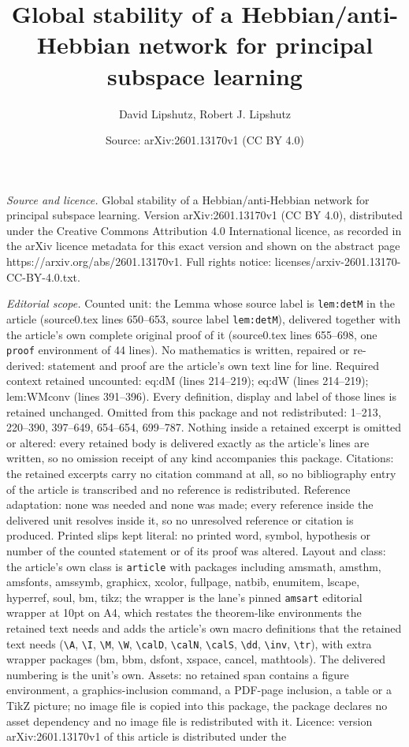 \documentclass[10pt,a4paper]{amsart}
\title[Global stability of a Hebbian/anti-Hebbian network for princ]{Global stability of a Hebbian/anti-Hebbian network for principal subspace learning}
\author{David Lipshutz, Robert J. Lipshutz}
\date{Source: arXiv:2601.13170v1 (CC BY 4.0)}
\begin{document}
\maketitle

\noindent\emph{Source and licence.} Global stability of a Hebbian/anti-Hebbian network for principal subspace learning. Version arXiv:2601.13170v1 (CC BY 4.0), distributed under the Creative Commons Attribution 4.0 International licence, as recorded in the arXiv licence metadata for this exact version and shown on the abstract page https://arxiv.org/abs/2601.13170v1. Full rights notice: licenses/arxiv-2601.13170-CC-BY-4.0.txt.\par\smallskip

\noindent\textit{Editorial scope.} Counted unit: the Lemma whose source label is \texttt{lem:detM} in the article (source0.tex lines 650--653, source label \texttt{lem:detM}), delivered together with the article's own complete original proof of it (source0.tex lines 655--698, one \texttt{proof} environment of 44 lines). No mathematics is written, repaired or re-derived: statement and proof are the article's own text line for line. Required context retained uncounted: eq:dM (lines 214--219); eq:dW (lines 214--219); lem:WMconv (lines 391--396). Every definition, display and label of those lines is retained unchanged. Omitted from this package and not redistributed: 1--213, 220--390, 397--649, 654--654, 699--787. Nothing inside a retained excerpt is omitted or altered: every retained body is delivered exactly as the article's lines are written, so no omission receipt of any kind accompanies this package. Citations: the retained excerpts carry no citation command at all, so no bibliography entry of the article is transcribed and no reference is redistributed. Reference adaptation: none was needed and none was made; every reference inside the delivered unit resolves inside it, so no unresolved reference or citation is produced. Printed slips kept literal: no printed word, symbol, hypothesis or number of the counted statement or of its proof was altered. Layout and class: the article's own class is \texttt{article} with packages including amsmath, amsthm, amsfonts, amssymb, graphicx, xcolor, fullpage, natbib, enumitem, lscape, hyperref, soul, bm, tikz; the wrapper is the lane's pinned \texttt{amsart} editorial wrapper at 10pt on A4, which restates the theorem-like environments the retained text needs and adds the article's own macro definitions that the retained text needs (\texttt{\textbackslash A}, \texttt{\textbackslash I}, \texttt{\textbackslash M}, \texttt{\textbackslash W}, \texttt{\textbackslash calD}, \texttt{\textbackslash calN}, \texttt{\textbackslash calS}, \texttt{\textbackslash dd}, \texttt{\textbackslash inv}, \texttt{\textbackslash tr}), with extra wrapper packages (bm, bbm, dsfont, xspace, cancel, mathtools). The delivered numbering is the unit's own. Assets: no retained span contains a figure environment, a graphics-inclusion command, a PDF-page inclusion, a table or a TikZ picture; no image file is copied into this package, the package declares no asset dependency and no image file is redistributed with it. Licence: version arXiv:2601.13170v1 of this article is distributed under the 
\end{document}
